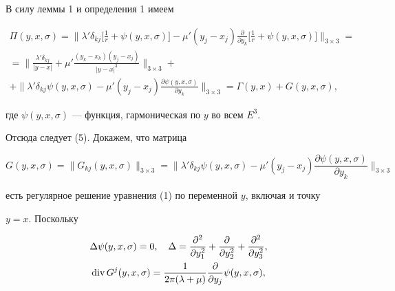 \begin{pf} 


В силу леммы 1 и определения 1 имеем 


\begin{gather*} 


\Pi(y,x,\sigma)=\bigg\|\lambda'\delta_{kj}\bigg[\frac{1}{r}+ 


\psi(y,x,\sigma)\bigg]-\mu'(y_j-x_j)\frac{\partial}{\partial y_k} 


\bigg[\frac{1}{r}+\psi(y,x,\sigma)\bigg]\bigg\|_{3\times 3}= \\ 


% 


=\bigg\|\frac{\lambda'\delta_{kj}}{|y-x|}+\mu' 


\frac{(y_k-x_k)(y_j-x_j)}{|y-x|^3}\bigg\|_{3\times 3}+ \\ +\bigg\| 


\lambda'\delta_{kj}\psi(y,x,\sigma)-\mu'(y_j-x_j) 


\frac{\partial\psi(y,x,\sigma)}{\partial y_k}\bigg\|_{3\times 3}=


\Gamma(y,x)+G(y,x,\sigma), 


\end{gather*} 


где $\psi(y,x,\sigma)$ --- функция, гармоническая по $y$ во всем $E^3$. 


Отсюда следует (5). Докажем, что матрица 


$$ 


G(y,x,\sigma)=\|G_{kj}(y,x,\sigma)\|_{3\times 3}=\bigg\|\lambda' 


\delta_{kj}\psi(y,x,\sigma)-\mu'(y_j-x_j) 


\frac{\partial\psi(y,x,\sigma)}{\partial y_k}\bigg\|_{3\times 3} 


$$ 


есть регулярное решение уравнения (1) по переменной $y$, включая и точку 


$y=x$. Поскольку 


\begin{gather*} 


\Delta\psi(y,x,\sigma)=0,\quad \Delta=\frac{\partial^2}{\partial y^2_1}+ 


\frac{\partial}{\partial y^2_2}+\frac{\partial^2}{\partial y^2_3},\\ 


% 


\Div G^j(y,x,\sigma)=\frac{1}{2\pi(\lambda+\mu)} 


\frac{\partial}{\partial y_j}\psi(y,x,\sigma), 



\end{gather*}
\end{pf}
